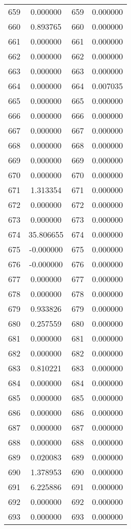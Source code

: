 \documentclass[12pt]{article}
\begin{document}
\begin{longtable}{@{}cccc@{}}
659 & 0.000000 & 659 & 0.000000 \\
660 & 0.893765 & 660 & 0.000000 \\
661 & 0.000000 & 661 & 0.000000 \\
662 & 0.000000 & 662 & 0.000000 \\
663 & 0.000000 & 663 & 0.000000 \\
664 & 0.000000 & 664 & 0.007035 \\
665 & 0.000000 & 665 & 0.000000 \\
666 & 0.000000 & 666 & 0.000000 \\
667 & 0.000000 & 667 & 0.000000 \\
668 & 0.000000 & 668 & 0.000000 \\
669 & 0.000000 & 669 & 0.000000 \\
670 & 0.000000 & 670 & 0.000000 \\
671 & 1.313354 & 671 & 0.000000 \\
672 & 0.000000 & 672 & 0.000000 \\
673 & 0.000000 & 673 & 0.000000 \\
674 & 35.806655 & 674 & 0.000000 \\
675 & -0.000000 & 675 & 0.000000 \\
676 & -0.000000 & 676 & 0.000000 \\
677 & 0.000000 & 677 & 0.000000 \\
678 & 0.000000 & 678 & 0.000000 \\
679 & 0.933826 & 679 & 0.000000 \\
680 & 0.257559 & 680 & 0.000000 \\
681 & 0.000000 & 681 & 0.000000 \\
682 & 0.000000 & 682 & 0.000000 \\
683 & 0.810221 & 683 & 0.000000 \\
684 & 0.000000 & 684 & 0.000000 \\
685 & 0.000000 & 685 & 0.000000 \\
686 & 0.000000 & 686 & 0.000000 \\
687 & 0.000000 & 687 & 0.000000 \\
688 & 0.000000 & 688 & 0.000000 \\
689 & 0.020083 & 689 & 0.000000 \\
690 & 1.378953 & 690 & 0.000000 \\
691 & 6.225886 & 691 & 0.000000 \\
692 & 0.000000 & 692 & 0.000000 \\
693 & 0.000000 & 693 & 0.000000 \\

\end{longtable}
\end{document}
